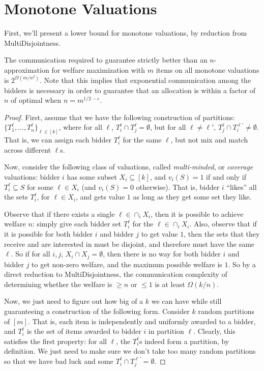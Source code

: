 \section{Monotone Valuations}
First, we'll present a lower bound for monotone valuations, by reduction from MultiDisjointness.

\begin{theorem}The communication required to guarantee strictly better than an $n$-approximation for welfare maximization with $m$ items on all monotone valuations is $2^{\Omega(m/n^2)}$. Note that this implies that exponential communication among the bidders is necessary in order to guarantee that an allocation is within a factor of $n$ of optimal when $n = m^{1/2-\varepsilon}$. 
\end{theorem}
\begin{proof}
First, assume that we have the following construction of partitions: $\{T_1^\ell,\ldots, T_n^\ell\}_{\ell \in [k]}$, where for all $\ell$, $T_i^\ell \cap T_j^\ell = \emptyset$, but for all $\ell \neq \ell'$, $T_j^\ell \cap T_i^{\ell'} \neq \emptyset$. That is, we can assign each bidder $T_i^\ell$ for the same $\ell$, but not mix and match across different $\ell$s. 

Now, consider the following class of valuations, called \emph{multi-minded}, or \emph{coverage} valuations: bidder $i$ has some subset $X_i \subseteq [k]$, and $v_i(S) = 1$ if and only if $T_i^\ell \subseteq S$ for some $\ell \in X_i$ (and $v_i(S) = 0$ otherwise). That is, bidder $i$ ``likes'' all the sets $T_i^\ell$, for $\ell \in X_i$, and gets value $1$ as long as they get some set they like. 

Observe that if there exists a single $\ell \in \cap_i X_i$, then it is possible to achieve welfare $n$: simply give each bidder set $T_i^\ell$ for the $\ell \in \cap_i X_i$. Also, observe that if it is possible for both bidder $i$ and bidder $j$ to get value $1$, then the sets that they receive and are interested in must be disjoint, and therefore must have the same $\ell$. So if for all $i, j$, $X_i \cap X_j = \emptyset$, then there is no way for both bidder $i$ and bidder $j$ to get non-zero welfare, and the maximum possible welfare is $1$. So by a direct reduction to MultiDisjointness, the communication complexity of determining whether the welfare is $\geq n$ or $\leq 1$ is at least $\Omega(k/n)$. 

Now, we just need to figure out how big of a $k$ we can have while still guaranteeing a construction of the following form. Consider $k$ random partitions of $[m]$. That is, each item is independently and uniformly awarded to a bidder, and $T_i^\ell$ is the set of items awarded to bidder $i$ in partition $\ell$. Clearly, this satisfies the first property: for all $\ell$, the $T_i^\ell$s indeed form a partition, by definition. We just need to make sure we don't take too many random partitions so that we have bad luck and some $T_i^\ell \cap T_j^{\ell'}= \emptyset$. 


\end{proof}
